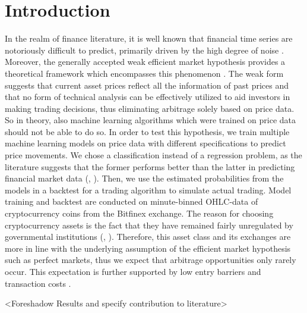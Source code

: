 \section{Introduction}
In the realm of finance literature, it is well known that financial time series
are notoriously difficult to predict, primarily driven by the high degree of noise \cite{fischer2017lstmMarketPrediction}.
Moreover, the generally accepted weak efficient market hypothesis provides a theoretical framework
which encompasses this phenomenon \cite{fama1970marketHypothesis}.
The weak form suggests that current asset prices reflect all the information of past prices 
and that no form of technical analysis can be effectively utilized to aid investors in making trading decisions,
thus eliminating arbitrage solely based on price data.
So in theory, also machine learning algorithms which were trained on price data 
should not be able to do so. 
In order to test this hypothesis, we train multiple machine learning models on price data with different
specifications to predict price movements. We chose a classification instead of a regression problem, as the literature
suggests that the former performs better than the latter in predicting financial market data
(\cite{leung2000classificationStockIndices}, \cite{enke2005classificationNN}).
Then, we use the estimated probabilities from the models in a backtest 
for a trading algorithm to simulate actual trading.
Model training and backtest are conducted on minute-binned OHLC-data of cryptocurrency coins from the 
Bitfinex exchange. The reason for choosing cryptocurrency assets is the fact that 
they have remained fairly unregulated by governmental institutions 
(\cite{dyhrberg2015bitcoinRegulations}, \cite{houben1994cryptoRegulation}).
Therefore, this asset class and its exchanges are more in line with the underlying assumption of the
efficient market hypothesis such as perfect markets, thus we expect that arbitrage opportunities only rarely occur. 
This expectation is further supported by low entry barriers and transaction costs \cite{bitfinex2012}.

<Foreshadow Results and specify contribution to literature>

